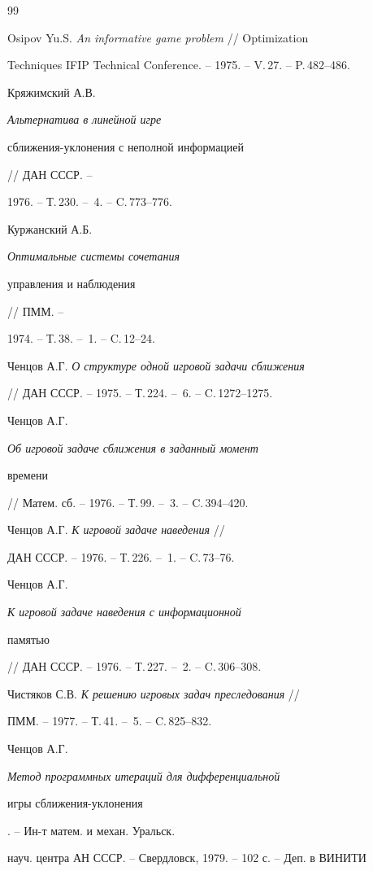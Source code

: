 \begin{thebibliography}{99}


Osipov Yu.S. {\em An informative game problem} // Optimization


Techniques IFIP Technical Conference. -- 1975. -- V.\,27. -- P.\,482--486.




Кряжимский А.В. {\em Альтернатива в линейной игре


сближения-уклонения с неполной информацией} // ДАН СССР. --


1976. -- Т.\,230. -- \No\,4. -- C.\,773--776.




Куржанский А.Б. {\em Оптимальные системы сочетания


управления и наблюдения} // ПММ. --


1974. -- Т.\,38. -- \No\,1. -- C.\,12--24.




Ченцов А.Г. {\em О структуре одной игровой задачи сближения}


// ДАН СССР. -- 1975. -- Т.\,224. -- \No\,6. -- C.\,1272--1275.




Ченцов А.Г. {\em Об игровой задаче сближения в заданный момент


времени} // Матем. сб. -- 1976. -- Т.\,99. -- \No\,3. -- C.\,394--420.




Ченцов А.Г. {\em К игровой задаче наведения} //


ДАН СССР. -- 1976. -- Т.\,226. -- \No\,1. -- C.\,73--76.




Ченцов А.Г. {\em К игровой задаче наведения с информационной


памятью} // ДАН СССР. -- 1976. -- Т.\,227. -- \No\,2. -- C.\,306--308.




Чистяков С.В. {\em К решению игровых задач преследования} //


ПММ. -- 1977. -- Т.\,41. -- \No\,5. -- C.\,825--832.




Ченцов А.Г. {\em Метод программных итераций для дифференциальной


игры сближения-уклонения}. -- Ин-т матем. и механ. Уральск.


науч. центра АН СССР. -- Свердловск, 1979. -- 102 с. -- Деп. в ВИНИТИ



\end{thebibliography}
